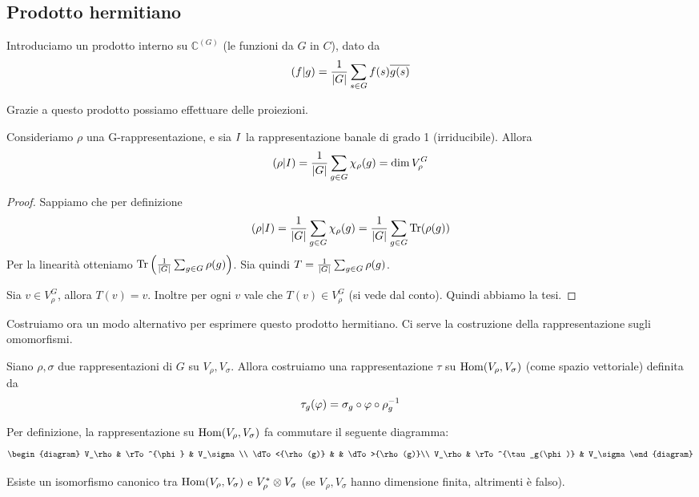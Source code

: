 \subsection{Prodotto hermitiano}
Introduciamo un prodotto interno su $\mathbb C^{(G)}$ (le funzioni da $G$ in $C$), dato da 
\[
  \left(f | g\right) = \frac 1{\left|G\right|} \sum_{s\in G} f(s)\overline{g(s)}
\]

Grazie a questo prodotto possiamo effettuare delle proiezioni.

\begin{mylemma}
  Consideriamo $\rho$ una G-rappresentazione, e sia $I$ la rappresentazione banale di grado 1 (irriducibile). Allora 
  \[
  \left(\rho | I\right) = \frac 1{\left|G\right|}\sum_{g\in G} \chi_\rho(g) = \dim V_\rho^G
  \]    
\end{mylemma}
\begin{proof}
  Sappiamo che per definizione
  \[
  \left(\rho | I\right) = \frac 1{\left|G\right|}\sum_{g\in G} \chi_\rho(g) = \frac 1{\left|G\right|}\sum_{g\in G} \operatorname{Tr}(\rho(g)) 
  \]
  Per la linearità otteniamo $\operatorname{Tr}\left(\frac 1{\left|G\right|}\sum_{g\in G}\rho(g)\right)$. Sia quindi $T=\frac 1{\left|G\right|}\sum_{g\in G}\rho(g)$.
  
  Sia $v \in V^G_\rho$, allora $T(v)=v$. Inoltre per ogni $v$ vale che $T(v) \in V^G_\rho$ (si vede dal conto). Quindi abbiamo la tesi.
  
\end{proof}

Costruiamo ora un modo alternativo per esprimere questo prodotto hermitiano. Ci serve la costruzione della rappresentazione sugli omomorfismi.

\begin{mydef}
  Siano $\rho, \sigma$ due rappresentazioni di $G$ su $V_\rho,V_\sigma$. Allora costruiamo una rappresentazione $\tau$ su $\operatorname{Hom}(V_\rho,V_\sigma)$ (come spazio vettoriale) definita da 
  \[
  \tau_g (\varphi) = \sigma_g \circ \varphi \circ \rho_g^{-1}
  \]
\end{mydef}

Per definizione, la rappresentazione su $\operatorname{Hom}(V_\rho,V_\sigma)$ fa commutare il seguente diagramma:
  \[
    \begin{diagram}
    V_\rho         & \rTo^{\phi}  & V_\sigma\\
    \dTo<{\rho(g)} &           	 & \dTo>{\rho(g)}\\
    V_\rho         & \rTo^{\tau_g(\phi)}  & V_\sigma
    \end{diagram}
  \]


\begin{myprop}
  Esiste un isomorfismo canonico tra $\operatorname{Hom} (V_\rho,V_\sigma)$ e $V_\rho^* \otimes V_\sigma$ (se $V_\rho, V_\sigma$ hanno dimensione finita, altrimenti è falso).
\end{myprop}

